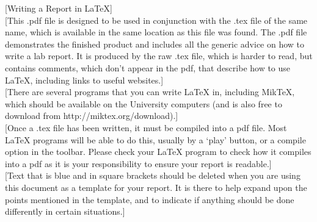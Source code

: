 \documentclass[11pt]{article} %
\begin{document}

{\color{blue}
{\LARGE [Writing a Report in \LaTeX]}\\

[This .pdf file is designed to be used in conjunction with the .tex file of the same name, which is available in the same location as this file was found. The .pdf file demonstrates the finished product and includes all the generic advice on how to write a lab report. It is produced by the raw .tex file, which is harder to read, but contains comments, which don't appear in the pdf, that describe how to use LaTeX, including links to useful websites.] \\

[There are several programs that you can write LaTeX in, including MikTeX, which should be available on the University computers (and is also free to download from http://miktex.org/download).] \\

[Once a .tex file has been written, it must be compiled into a pdf file. Most LaTeX programs will be able to do this, usually by a `play' button, or a compile option in the toolbar. Please check your LaTeX program to check how it compiles into a pdf as it is your responsibility to ensure your report is readable.] \\

 [Text that is blue and in square brackets should be deleted when you are using this document as a template for your report. It is there to help expand upon the points mentioned in the template, and to indicate if anything should be done differently in certain situations.]\\


\newpage
}


\end{document}
